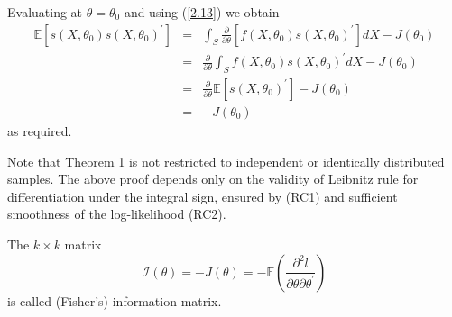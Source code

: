 \documentclass[notes=show]{beamer}
\begin{document}
\begin{frame}%


Evaluating at $\theta =\theta _{0}$ and using (\ref{2.13}) we obtain%
\begin{eqnarray*}
\mathbb{E}\left[ s\left( X,\theta _{0}\right) s\left( X,\theta _{0}\right)
^{\prime }\right]  &=&\int_{S}\frac{\partial }{\partial \theta }\left[
f\left( X,\theta _{0}\right) s\left( X,\theta _{0}\right) ^{\prime }\right]
dX-J\left( \theta _{0}\right)  \\
&=&\frac{\partial }{\partial \theta }\int_{S}f\left( X,\theta _{0}\right)
s\left( X,\theta _{0}\right) ^{\prime }dX-J\left( \theta _{0}\right)  \\
&=&\frac{\partial }{\partial \theta }\mathbb{E}\left[ s\left( X,\theta
_{0}\right) ^{\prime }\right] -J\left( \theta _{0}\right)  \\
&=&-J\left( \theta _{0}\right) 
\end{eqnarray*}%
as required.

\end{frame}%

\begin{frame}%


Note that Theorem 1 is not restricted to independent or identically
distributed samples. The above proof depends only on the validity of
Leibnitz rule for differentiation under the integral sign, ensured by (RC1)
and sufficient smoothness of the log-likelihood (RC2).

\begin{definition}
The $k\times k$ matrix%
\begin{equation}
\mathcal{I}\left( \theta \right) =-J\left( \theta \right) =-\mathbb{E}\left( 
\frac{\partial ^{2}l}{\partial \theta \partial \theta ^{\prime }}\right) 
\label{2.19}
\end{equation}%
is called (Fisher's) information matrix.
\end{definition}

\end{frame}%
\end{document}
